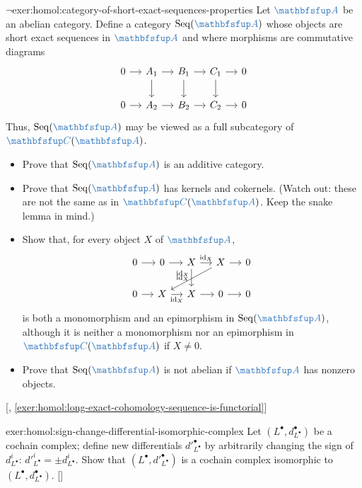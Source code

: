 \begin{exer}{$\lnot$}{exer:homol:category-of-short-exact-sequences-properties}
  Let $\categ{A}$ be an abelian category. Define a category
  $\operatorname{Seq}(\categ{A})$ whose objects are short exact
  sequences in $\categ{A}$ and where morphisms are commutative
  diagrams
  \[\begin{tikzcd}[column sep=small]
      0 \arrow[r] & A_1 \arrow[r] \arrow[d] & B_1 \arrow[r] \arrow[d]
      &
      C_1 \arrow[r] \arrow[d] & 0 \\
      0 \arrow[r] & A_2 \arrow[r] & B_2 \arrow[r] & C_2 \arrow[r] & 0
    \end{tikzcd}\] Thus, $\operatorname{Seq}(\categ{A})$ may be viewed
  as a full subcategory of $\categ{C}(\categ{A})$.
  \begin{itemize}
  \item Prove that $\operatorname{Seq}(\categ{A})$ is an additive
    category.
  \item Prove that $\operatorname{Seq}(\categ{A})$ has kernels and
    cokernels. (Watch out: these are not the same as in
    $\categ{C}(\categ{A})$. Keep the snake lemma in mind.)
  \item Show that, for every object $X$ of $\categ{A}$,
    \[\begin{tikzcd}[column sep=small]
        0 \arrow[r] & 0 \arrow[r] & X \arrow[r, "\id_X"] \arrow[d,
        "\id_X"'] &
        X \arrow[r] & 0 \\
        0 \arrow[r] & X \arrow[r, "\id_X"'] & X \arrow[r] & 0
        \arrow[r] & 0 \arrow[from=1-4, to=2-2, "\id_X"']
      \end{tikzcd}\] is both a monomorphism and an epimorphism in
    $\operatorname{Seq}(\categ{A})$, although it is neither a
    monomorphism nor an epimorphism in $\categ{C}(\categ{A})$ if
    $X \neq 0$.
  \item Prove that $\operatorname{Seq}(\categ{A})$ is not abelian if
    $\categ{A}$ has nonzero objects.
  \end{itemize} [,
  \ref{exer:homol:long-exact-cohomology-sequence-is-functorial}]
\end{exer}
\begin{exer}{\exerused{}}{exer:homol:sign-change-differential-isomorphic-complex}
  Let $(L^\bullet, d^\bullet_{L^\bullet})$ be a cochain complex;
  define new differentials $d'^\bullet_{L^\bullet}$ by arbitrarily
  changing the sign of $d^i_{L^\bullet}$:
  $d'^i_{L^\bullet} = \pm d^i_{L^\bullet}$. Show that
  $(L^\bullet, d'^\bullet_{L^\bullet})$ is a cochain complex
  isomorphic to $(L^\bullet,
  d^\bullet_{L^\bullet})$. []
\end{exer}
